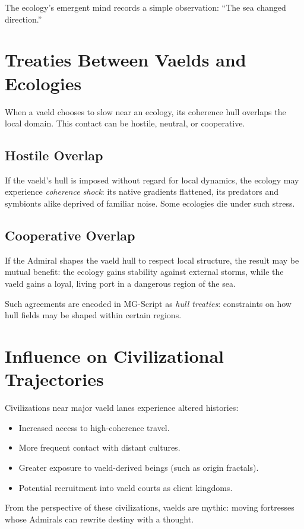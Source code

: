 The ecology's emergent mind records a simple observation: ``The sea changed direction.''

\section{Treaties Between Vaelds and Ecologies}
When a vaeld chooses to slow near an ecology, its coherence hull overlaps the local domain. This
contact can be hostile, neutral, or cooperative.

\subsection{Hostile Overlap}
If the vaeld's hull is imposed without regard for local dynamics, the ecology may experience
\emph{coherence shock}: its native gradients flattened, its predators and symbionts alike deprived
of familiar noise. Some ecologies die under such stress.

\subsection{Cooperative Overlap}
If the Admiral shapes the vaeld hull to respect local structure, the result may be mutual benefit:
the ecology gains stability against external storms, while the vaeld gains a loyal, living port in a
dangerous region of the sea.

Such agreements are encoded in MG-Script as \emph{hull treaties}: constraints on how hull fields
may be shaped within certain regions.

\section{Influence on Civilizational Trajectories}
Civilizations near major vaeld lanes experience altered histories:

\begin{itemize}
  \item Increased access to high-coherence travel.
  \item More frequent contact with distant cultures.
  \item Greater exposure to vaeld-derived beings (such as origin fractals).
  \item Potential recruitment into vaeld courts as client kingdoms.
\end{itemize}

From the perspective of these civilizations, vaelds are mythic: moving fortresses whose Admirals
can rewrite destiny with a thought.

